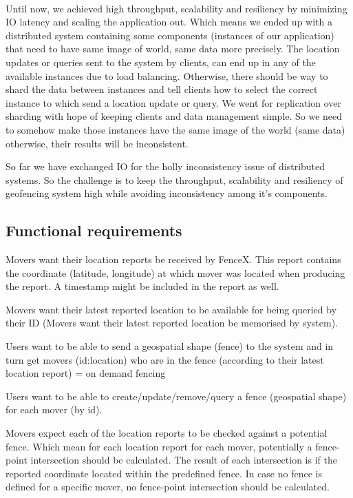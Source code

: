 \documentclass[a4]{report}
\begin{document}
        \paragraph{}
        Until now, we achieved high throughput, scalability and resiliency by minimizing IO latency and scaling the
        application out.
        Which means we ended up with a distributed system containing some components (instances of our application) that
        need to have same image of world, same data more precisely.
        The location updates or queries sent to the system by clients, can end up in any of the available instances due
        to load balancing.
        Otherwise, there should be way to shard the data between instances and tell clients how to select the correct
        instance to which send a location update or query.
        We went for replication over sharding with hope of keeping clients and data management simple.
        So we need to somehow make those instances have the same image of the world (same data) otherwise, their results
        will be inconsistent.

        So far we have exchanged IO for the holly inconsistency issue of distributed systems.
        So the challenge is to keep the throughput, scalability and resiliency of geofencing system high while avoiding
        inconsistency among it's components.

        \subsection{Functional requirements}
        Movers want their location reports be received by FenceX.
        This report contains the coordinate (latitude, longitude) at which mover was located when producing the report.
        A timestamp might be included in the report as well.

        Movers want their latest reported location to be available for being queried by their ID (Movers want their
        latest reported location be memorised by system).

        Users want to be able to send a geospatial shape (fence) to the system and in turn get movers (id:location) who
        are in the fence (according to their latest location report) = on demand fencing

        Users want to be able to create/update/remove/query a fence (geospatial shape) for each mover (by id).

        Movers expect each of the location reports to be checked against a potential fence.
        Which mean for each location report for each mover, potentially a fence-point intersection should be calculated.
        The result of each intersection is if the reported coordinate located within the predefined fence.
        In case no fence is defined for a specific mover, no fence-point intersection should be calculated.
\end{document}
